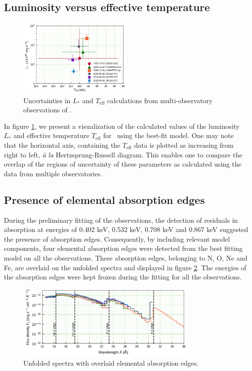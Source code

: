    \subsection{Luminosity versus effective temperature}
    \begin{figure}[!thb]
    	\centering
    	\includegraphics[width=0.5\textwidth]{figures/L-Teff_all-obs.png}
    	\caption{Uncertainties in $L_*$ and $T_\text{eff}$ calculations from multi-observatory observations of \source.}
    	\label{fig:L-Teff}
    \end{figure}
    In figure \ref{fig:L-Teff}, we present a visualization of the calculated values of the luminosity $L_*$ and effective temperature $T_\text{eff}$ for \source\ using the best-fit model. One may note that the horizontal axis, containing the $T_\text{eff}$ data is plotted as increasing from right to left, \textit{\`{a} la} Hertzsprung-Russell diagram. This enables one to compare the overlap of the regions of uncertainty of these parameters as calculated using the data from multiple observatories.

    \subsection{Presence of elemental absorption edges}
	During the preliminary fitting of the observations, the detection of residuals in absorption at energies of 0.402 keV, 0.532 keV, 0.708 keV and 0.867 keV suggested the presence of absorption edges. Consequently, by including relevant model components, four elemental absorption edges were detected from the best fitting model on all the observations. These absorption edges, belonging to N, O, Ne and Fe, are overlaid on the unfolded spectra and displayed in figure \ref{fig:all-uf:abs-edges}. The energies of the absorption edges were kept frozen during the fitting for all the observations.
    \begin{figure}[!htb]
        \centering
        \includegraphics[width=0.8\textwidth]{figures/eufspec/mr-vel-uf-ang_abs-edge.png}
        \caption{Unfolded spectra with overlaid elemental absorption edges.}
        \label{fig:all-uf:abs-edges}
    \end{figure}
    
